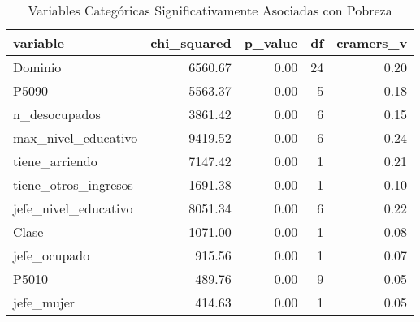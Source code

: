 \begin{table}[ht]
\centering
\begin{tabular}{lrrrr}
  \toprule
variable & chi\_squared & p\_value & df & cramers\_v \\ 
  \midrule
Dominio & 6560.67 & 0.00 &  24 & 0.20 \\ 
  P5090 & 5563.37 & 0.00 &   5 & 0.18 \\ 
  n\_desocupados & 3861.42 & 0.00 &   6 & 0.15 \\ 
  max\_nivel\_educativo & 9419.52 & 0.00 &   6 & 0.24 \\ 
  tiene\_arriendo & 7147.42 & 0.00 &   1 & 0.21 \\ 
  tiene\_otros\_ingresos & 1691.38 & 0.00 &   1 & 0.10 \\ 
  jefe\_nivel\_educativo & 8051.34 & 0.00 &   6 & 0.22 \\ 
  Clase & 1071.00 & 0.00 &   1 & 0.08 \\ 
  jefe\_ocupado & 915.56 & 0.00 &   1 & 0.07 \\ 
  P5010 & 489.76 & 0.00 &   9 & 0.05 \\ 
  jefe\_mujer & 414.63 & 0.00 &   1 & 0.05 \\ 
   \bottomrule
\end{tabular}
\caption{Variables Categóricas Significativamente Asociadas con Pobreza} 
\label{tab:signif_cat_vars}
\end{table}
